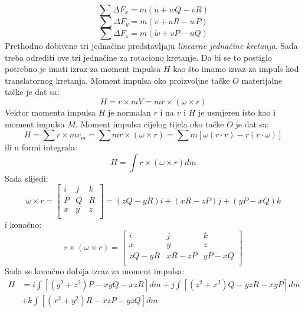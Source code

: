 \begin{equation}
    \sum \Delta F_x=m(\dot{u}+wQ-vR)
    \label{eq:r1}
\end{equation}
\begin{equation}
    \sum \Delta F_y=m(\dot{v}+uR-wP)
    \label{eq:r2}
\end{equation}
\begin{equation}
    \sum \Delta F_z=m(\dot{w}+vP-uQ)
    \label{eq:r3}
\end{equation}
Prethodno dobivene tri jednačine predstavljaju \textit{linearne jednačine kretanja}. Sada treba odrediti 
ove tri jednačine za rotaciono kretanje. Da bi se to postiglo potrebno je imati izraz za 
moment impulsa $H$ kao što imamo izraz za impuls kod translatornog kretanja. Moment impulsa oko 
proizvoljne tačke $O$ materijalne tačke je dat sa:
\begin{equation}
    H=r\times mV=mr\times (\omega \times r)
\end{equation}
Vektor momenta impulsa $H$ je normalan $r$ i na $v$ i $H$ je usmjeren isto kao i moment impulsa $M$.
Moment impulsa cijelog tijela oko tačke $O$ je dat sa:
\begin{equation}
    H=\sum r\times mv_m=\sum mr\times (\omega \times r)=\sum m\left[\omega(r\cdot r )-r(r\cdot \omega) \right]
\end{equation}
ili u formi integrala:
\begin{equation}
    H=\int r\times (\omega \times r)dm
\end{equation}
Sada slijedi:
\begin{equation}
    \omega \times r=\begin{bmatrix}
        i&j&k\\
        P&Q&R\\
        x&y&z\\
    \end{bmatrix}=(zQ-yR)i+(xR-zP)j+(yP-xQ)k
\end{equation}
 i konačno:
 \begin{equation}
    r\times (\omega \times r)=\begin{bmatrix}
        i&j&k\\
        x&y&z\\
        zQ-yR&xR-zP&yP-xQ\\
    \end{bmatrix}
 \end{equation}
 Sada se konačno dobija izraz za moment impulsa:
 \begin{equation}
    \begin{split}      
     H&=i\int \left[ (y^2+z^2)P -xyQ -xzR \right]dm+j\int\left[ (z^2+x^2)Q-yzR-xyP \right]dm\\ 
     &+k\int \left[ (x^2+y^2)R-xzP-yzQ \right]dm    
    \end{split}
    \end{equation}

